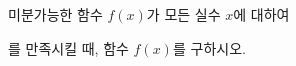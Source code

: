 \hspace*{2mm}\begin{minipage}[t]{\dimexpr\linewidth-2mm\relax}\vspace{0pt}
미분가능한 함수 $f(x)$가 모든 실수 $x$에 대하여 \par\smallskip{}\par\smallskip\noindent 를 만족시킬 때, 함수 $f(x)$를 구하시오.\end{minipage}
